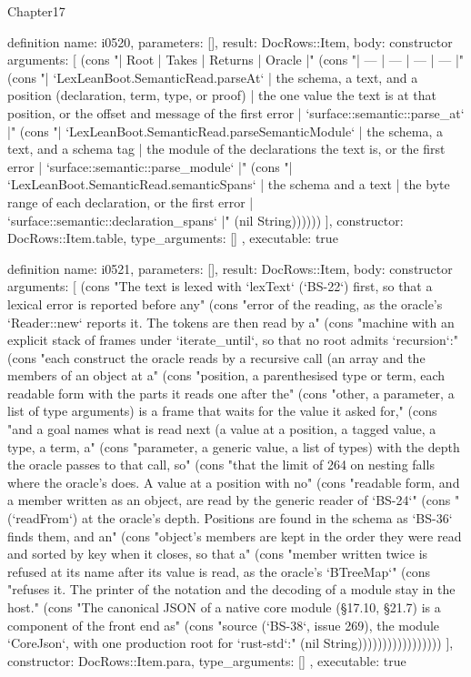 \begin{lexlean}{Chapter17}
\begin{semanticmodule}
definition{
  name: i0520,
  parameters: [],
  result: DocRows::Item,
  body: constructor{
    arguments: [
      (cons "| Root | Takes | Returns | Oracle |" (cons "| --- | --- | --- | --- |" (cons "| `LexLeanBoot.SemanticRead.parseAt` | the schema, a text, and a position (declaration, term, type, or proof) | the one value the text is at that position, or the offset and message of the first error | `surface::semantic::parse_at` |" (cons "| `LexLeanBoot.SemanticRead.parseSemanticModule` | the schema, a text, and a schema tag | the module of the declarations the text is, or the first error | `surface::semantic::parse_module` |" (cons "| `LexLeanBoot.SemanticRead.semanticSpans` | the schema and a text | the byte range of each declaration, or the first error | `surface::semantic::declaration_spans` |" (nil String))))))
    ],
    constructor: DocRows::Item.table,
    type_arguments: []
  },
  executable: true
}

definition{
  name: i0521,
  parameters: [],
  result: DocRows::Item,
  body: constructor{
    arguments: [
      (cons "The text is lexed with `lexText` (`BS-22`) first, so that a lexical error is reported before any" (cons "error of the reading, as the oracle's `Reader::new` reports it. The tokens are then read by a" (cons "machine with an explicit stack of frames under `iterate_until`, so that no root admits `recursion`:" (cons "each construct the oracle reads by a recursive call (an array and the members of an object at a" (cons "position, a parenthesised type or term, each readable form with the parts it reads one after the" (cons "other, a parameter, a list of type arguments) is a frame that waits for the value it asked for," (cons "and a goal names what is read next (a value at a position, a tagged value, a type, a term, a" (cons "parameter, a generic value, a list of types) with the depth the oracle passes to that call, so" (cons "that the limit of 264 on nesting falls where the oracle's does. A value at a position with no" (cons "readable form, and a member written as an object, are read by the generic reader of `BS-24`" (cons "(`readFrom`) at the oracle's depth. Positions are found in the schema as `BS-36` finds them, and an" (cons "object's members are kept in the order they were read and sorted by key when it closes, so that a" (cons "member written twice is refused at its name after its value is read, as the oracle's `BTreeMap`" (cons "refuses it. The printer of the notation and the decoding of a module stay in the host." (cons "The canonical JSON of a native core module (§17.10, §21.7) is a component of the front end as" (cons "source (`BS-38`, issue 269), the module `CoreJson`, with one production root for `rust-std`:" (nil String)))))))))))))))))
    ],
    constructor: DocRows::Item.para,
    type_arguments: []
  },
  executable: true
}


\end{semanticmodule}
\end{lexlean}
